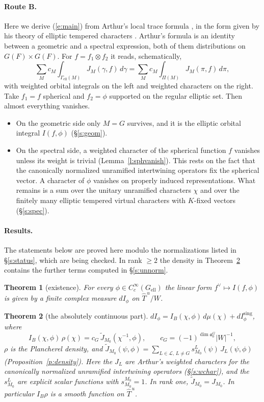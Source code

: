 \documentclass[12pt,letterpaper]{article}
\numberwithin{equation}{section}
\theoremstyle{plain}
\newtheorem{introtheorem}{Theorem}
\theoremstyle{definition}
\theoremstyle{remark}
\newcommand{\cL}{\mathcal{L}}
\newcommand{\fa}{\mathfrak{a}}
\newcommand{\Thu}{\widehat{T}^{\,u}}
\newcommand{\ellr}{\mathrm{ell}}
\begin{document}
\paragraph{Route B.} Here we derive (\ref{e:main}) from Arthur's local trace formula \cite{Ar89a,Ar91}, in the form given by his theory of elliptic tempered characters \cite{Ar93}. Arthur's formula is an identity between a geometric and a spectral expression, both of them distributions on $G(F)\times G(F)$. For $f=f_1\otimes f_2$ it reads, schematically,
\[
\sum_M c_M\int_{\Gamma_{\ellr}(M)}J_M(\gamma,f)\,d\gamma=\sum_M c_M\int_{\Pi(M)}J_M(\pi,f)\,d\pi,
\]
with weighted orbital integrals on the left and weighted characters on the right. Take $f_1=f$ spherical and $f_2=\phi$ supported on the regular elliptic set. Then almost everything vanishes.
\begin{itemize}
\item On the geometric side only $M=G$ survives, and it is the elliptic orbital integral $I(f,\phi)$ (\S\ref{s:geom}).
\item On the spectral side, a weighted character of the spherical function $f$ vanishes unless its weight is trivial (Lemma~\ref{l:sphvanish}). This rests on the fact that the canonically normalized unramified intertwining operators fix the spherical vector. A character of $\phi$ vanishes on properly induced representations. What remains is a sum over the unitary unramified characters $\chi$ and over the finitely many elliptic tempered virtual characters with $K$-fixed vectors (\S\ref{s:spec}).
\end{itemize}

\paragraph{Results.} The statements below are proved here modulo the normalizations listed in \S\ref{s:status}, which are being checked. In rank $\ge2$ the density in Theorem~\ref{t:B} contains the further terms computed in \S\ref{s:unnorm}.

\begin{introtheorem}[existence]\label{t:A}
For every $\phi\in C_c^\infty(G_{\ellr})$ the linear form $f^\vee\mapsto I(f,\phi)$ is given by a finite complex measure $dI_\phi$ on $\Thu/W$.
\end{introtheorem}

\begin{introtheorem}[the absolutely continuous part]\label{t:B}
$dI_\phi=I_B(\chi,\phi)\,d\mu(\chi)+dI^{\mathrm{sing}}_\phi$, where
\[
I_B(\chi,\phi)\,\rho(\chi)=c_G\,\widetilde J_{M_0}(\chi^{-1},\phi),\qquad c_G=(-1)^{\dim\fa_0^G}|W|^{-1},
\]
$\rho$ is the Plancherel density, and $\widetilde J_{M_0}(\psi,\phi)=\sum_{L\in\cL,\,L\ne G}s^L_{M_0}(\psi)\,J_L(\psi,\phi)$ (Proposition~\ref{p:density}). Here the $J_L$ are Arthur's weighted characters for the canonically normalized unramified intertwining operators (\S\ref{s:wchar}), and the $s^L_{M_0}$ are explicit scalar functions with $s^{M_0}_{M_0}=1$. In rank one, $\widetilde J_{M_0}=J_{M_0}$. In particular $I_B\rho$ is a smooth function on $\Thu$.
\end{introtheorem}
\end{document}
